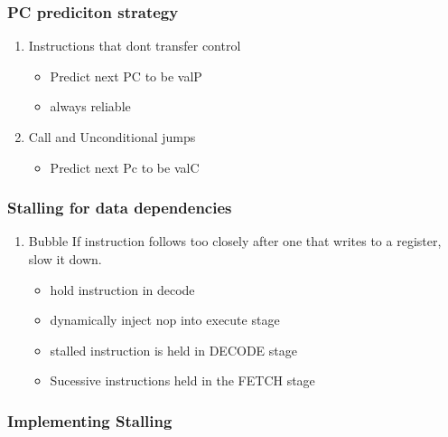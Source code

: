 \documentclass[11pt]{article}
\begin{document}
\subsubsection{PC prediciton strategy}
\label{sec:orgheadline40}
\begin{enumerate}
\item Instructions that dont transfer control
\label{sec:orgheadline38}
\begin{itemize}
\item Predict next PC to be valP
\item always reliable
\end{itemize}
\item Call and Unconditional jumps
\label{sec:orgheadline39}
\begin{itemize}
\item Predict next Pc to be valC
\end{itemize}
\end{enumerate}
\subsubsection{Stalling for data dependencies}
\label{sec:orgheadline42}
\begin{enumerate}
\item Bubble
\label{sec:orgheadline41}
If instruction follows too closely after one that writes to a register, slow it down.
\begin{itemize}
\item hold instruction in decode
\item dynamically inject nop into execute stage
\item stalled instruction is held in DECODE stage
\item Sucessive instructions held in the FETCH stage
\end{itemize}
\end{enumerate}
\subsubsection{Implementing Stalling}
\label{sec:orgheadline43}
\end{document}

